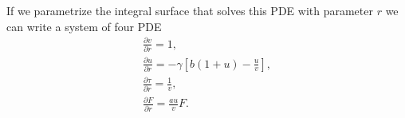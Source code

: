 If we parametrize the integral surface that solves this PDE with parameter $r$
we can write a system of four PDE 
\begin{align}
  \frac{\partial v}{\partial r} = 1,\\
  \frac{\partial u}{\partial r} = - \gamma \left[ b (1 + u) - \frac{u}{v}
  \right],\\
  \frac{\partial \tau}{\partial r} = \frac{1}{v},\\
  \frac{\partial F}{\partial r} = \frac{a u}{v} F.
\end{align}
